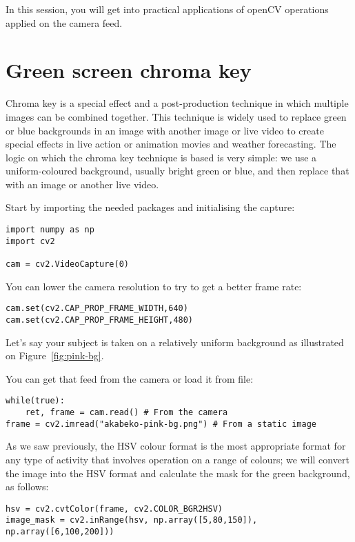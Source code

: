 \documentclass{labo}
\author{}
\begin{document}

In this session, you will get into practical applications of openCV operations applied on the camera feed.

\section*{}



\section*{Green screen chroma key}
Chroma key is a special effect and a post-production technique in which multiple images can be combined together. 
This technique is widely used to replace green or blue backgrounds in an image with another image or live video to create special effects in live action or animation movies and weather forecasting. 
The logic on which the chroma key technique is based is very simple: we use a uniform-coloured background, usually bright green or blue, and then replace that with an image or another live video.

Start by importing the needed packages and initialising the capture:
\begin{verbatim}
import numpy as np
import cv2

cam = cv2.VideoCapture(0)
\end{verbatim}

You can lower the camera resolution to try to get a better frame rate:
\begin{verbatim}
cam.set(cv2.CAP_PROP_FRAME_WIDTH,640)
cam.set(cv2.CAP_PROP_FRAME_HEIGHT,480)
\end{verbatim}

Let's say your subject is taken on a relatively uniform background as illustrated on Figure~\ref{fig:pink-bg}.


You can get that feed from the camera or load it from file:
\begin{verbatim}
while(true):
	ret, frame = cam.read() # From the camera
frame = cv2.imread("akabeko-pink-bg.png") # From a static image
\end{verbatim}

As we saw previously, the  HSV colour format is the most appropriate format for any type of activity that involves operation on a range of colours; we will convert the image into the HSV format and calculate the mask for the green background, as follows:
\begin{verbatim}
hsv = cv2.cvtColor(frame, cv2.COLOR_BGR2HSV)
image_mask = cv2.inRange(hsv, np.array([5,80,150]), np.array([6,100,200]))
\end{verbatim}
\end{document}
